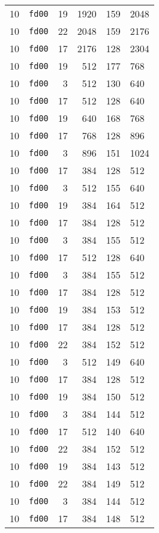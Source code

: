 \documentclass{article}
\begin{document}
\begin{table}[h!]
\begin{tabular}{llrrrl}
    10 & \texttt{fd00} & 19 & 1920 & 159 & 2048 \\
    10 & \texttt{fd00} & 22 & 2048 & 159 & 2176 \\
    10 & \texttt{fd00} & 17 & 2176 & 128 & 2304 \\
    10 & \texttt{fd00} & 19 & 512 & 177 & 768 \\
    10 & \texttt{fd00} & 3 & 512 & 130 & 640 \\
    10 & \texttt{fd00} & 17 & 512 & 128 & 640 \\
    10 & \texttt{fd00} & 19 & 640 & 168 & 768 \\
    10 & \texttt{fd00} & 17 & 768 & 128 & 896 \\
    10 & \texttt{fd00} & 3 & 896 & 151 & 1024 \\
    10 & \texttt{fd00} & 17 & 384 & 128 & 512 \\
    10 & \texttt{fd00} & 3 & 512 & 155 & 640 \\
    10 & \texttt{fd00} & 19 & 384 & 164 & 512 \\
    10 & \texttt{fd00} & 17 & 384 & 128 & 512 \\
    10 & \texttt{fd00} & 3 & 384 & 155 & 512 \\
    10 & \texttt{fd00} & 17 & 512 & 128 & 640 \\
    10 & \texttt{fd00} & 3 & 384 & 155 & 512 \\
    10 & \texttt{fd00} & 17 & 384 & 128 & 512 \\
    10 & \texttt{fd00} & 19 & 384 & 153 & 512 \\
    10 & \texttt{fd00} & 17 & 384 & 128 & 512 \\
    10 & \texttt{fd00} & 22 & 384 & 152 & 512 \\
    10 & \texttt{fd00} & 3 & 512 & 149 & 640 \\
    10 & \texttt{fd00} & 17 & 384 & 128 & 512 \\
    10 & \texttt{fd00} & 19 & 384 & 150 & 512 \\
    10 & \texttt{fd00} & 3 & 384 & 144 & 512 \\
    10 & \texttt{fd00} & 17 & 512 & 140 & 640 \\
    10 & \texttt{fd00} & 22 & 384 & 152 & 512 \\
    10 & \texttt{fd00} & 19 & 384 & 143 & 512 \\
    10 & \texttt{fd00} & 22 & 384 & 149 & 512 \\
    10 & \texttt{fd00} & 3 & 384 & 144 & 512 \\
    10 & \texttt{fd00} & 17 & 384 & 148 & 512 \\

\end{tabular}
\end{table}
\end{document}
